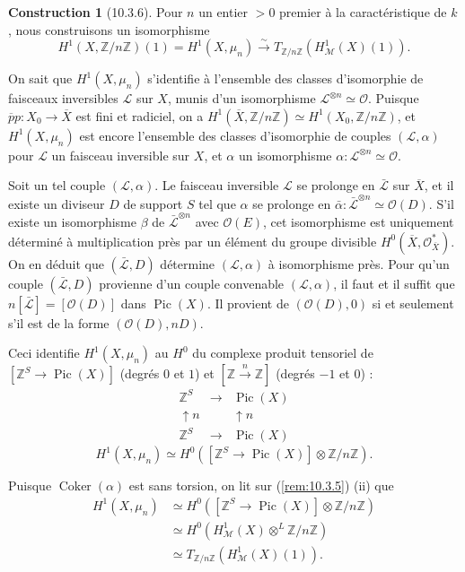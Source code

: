 \documentclass[12pt,a4paper]{amsart}
\theoremstyle{plain}
\theoremstyle{definition}
\newtheorem{construction}[lemme]{Construction}
\theoremstyle{remark}
\DeclareMathOperator{\Coker}{Coker}
\DeclareMathOperator{\Pic}{Pic}
\numberwithin{equation}{section}
\begin{document}
\begin{construction}[10.3.6]\label{cons:10.3.6}
Pour $n$ un entier $>0$ premier à la caractéristique de $k$, nous construisons un isomorphisme
\[
H^1(X,\mathbb{Z}/n\mathbb{Z})(1)=H^1(X,\mu_n)\xrightarrow{\sim}T_{\mathbb{Z}/n\mathbb{Z}}(H_\mathscr{M}^1(X)(1)).
\]
\end{construction}

On sait que $H^1(X,\mu_n)$ s'identifie à l'ensemble des classes d'isomorphie de faisceaux inversibles $\mathscr{L}$ sur $X$, munis d'un isomorphisme $\mathscr{L}^{\otimes n}\simeq\mathcal{O}$. Puisque $\overline{p}p:X_0\to\overline{X}$ est fini et radiciel, on a $H^1(\overline{X},\mathbb{Z}/n\mathbb{Z})\simeq H^1(X_0,\mathbb{Z}/n\mathbb{Z})$, et $H^1(X,\mu_n)$ est encore l'ensemble des classes d'isomorphie de couples $(\mathscr{L},\alpha)$ pour $\mathscr{L}$ un faisceau inversible sur $X$, et $\alpha$ un isomorphisme $\alpha:\mathscr{L}^{\otimes n}\simeq\mathcal{O}$.

Soit un tel couple $(\mathscr{L},\alpha)$. Le faisceau inversible $\mathscr{L}$ se prolonge en $\bar{\mathscr{L}}$ sur $\overline{X}$, et il existe un diviseur $D$ de support $S$ tel que $\alpha$ se prolonge en $\bar{\alpha}:\bar{\mathscr{L}}^{\otimes n}\simeq\mathcal{O}(D)$. S'il existe un isomorphisme $\beta$ de $\bar{\mathscr{L}}^{\otimes n}$ avec $\mathcal{O}(E)$, cet isomorphisme est uniquement déterminé à multiplication près par un élément du groupe divisible $H^0(\overline{X},\mathcal{O}_{\overline{X}}^*)$. On en déduit que $(\bar{\mathscr{L}},D)$ détermine $(\mathscr{L},\alpha)$ à isomorphisme près. Pour qu'un couple $(\bar{\mathscr{L}},D)$ provienne d'un couple convenable $(\mathscr{L},\alpha)$, il faut et il suffit que $n[\bar{\mathscr{L}}]=[\mathcal{O}(D)]$ dans $\Pic(X)$. Il provient de $(\mathcal{O}(D),0)$ si et seulement s'il est de la forme $(\mathcal{O}(D),nD)$.

Ceci identifie $H^1(X,\mu_n)$ au $H^0$ du complexe produit tensoriel de $[\mathbb{Z}^S\to\Pic(X)]$ (degrés $0$ et $1$) et $[\mathbb{Z}\xrightarrow{n}\mathbb{Z}]$ (degrés $-1$ et $0$) :
\[
\begin{array}{ccc}
\mathbb{Z}^S & \longrightarrow & \Pic(X) \\
\uparrow n & & \uparrow n \\
\mathbb{Z}^S & \longrightarrow & \Pic(X)
\end{array}
\]
\[
H^1(X,\mu_n)\simeq H^0([\mathbb{Z}^S\to\Pic(X)]\otimes\mathbb{Z}/n\mathbb{Z}).
\]

Puisque $\Coker(\alpha)$ est sans torsion, on lit sur (\ref{rem:10.3.5}) (ii) que
\begin{align*}
H^1(X,\mu_n) &\simeq H^0([\mathbb{Z}^S\to\Pic(X)]\otimes\mathbb{Z}/n\mathbb{Z}) \\
&\simeq H^0(H_\mathscr{M}^1(X)\otimes^L\mathbb{Z}/n\mathbb{Z}) \\
&\simeq T_{\mathbb{Z}/n\mathbb{Z}}(H_\mathscr{M}^1(X)(1)).
\end{align*}
\end{document}
